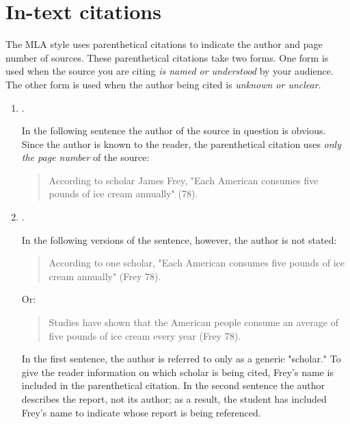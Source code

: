 \newpage

\section{In-text citations}
The MLA style uses parenthetical citations to indicate the author and page number of sources. These parenthetical citations take two forms. One form is used when the source you are citing \emph{is named or understood} by your audience. The other form is used when the author being cited is \emph{unknown or unclear}. 

\begin{enumerate}

\item {}. \smallskip

In the following sentence the author of the source in question is obvious. Since the author is known to the reader, the parenthetical citation uses \emph{only the page number} of the source: 

\begin{quote}
According to scholar James Frey, "Each American consumes five pounds of ice cream 
annually" (78).
\end{quote}

\item {}. \smallskip

In the following versions of the sentence, however, the author is not stated:

\begin{quote}
According to one scholar, "Each American consumes five pounds of ice cream 
annually" (Frey 78).
\end{quote}

\noindent Or:
\begin{quote}
Studies have shown that the American people consume an average of five pounds of ice 
cream every year (Frey 78).
\end{quote}

\noindent In the first sentence, the author is referred to only as a generic "scholar." To give the reader information on which scholar is being cited, Frey's name is included in the parenthetical citation. In the second sentence the author describes the report, not its author; as a result, the student has included Frey's name to indicate whose report is being referenced. 

\end{enumerate}

